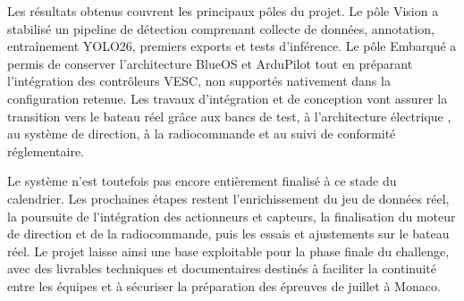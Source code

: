 \documentclass[11pt,letterpaper]{article}
\begin{document}
Les résultats obtenus couvrent les principaux pôles du projet. 
Le pôle Vision a stabilisé un pipeline de détection comprenant collecte de 
données, annotation, entraînement YOLO26, premiers exports et tests d'inférence. 
Le pôle Embarqué a permis de conserver l'architecture BlueOS et ArduPilot tout en 
préparant l'intégration des contrôleurs VESC, non supportés nativement dans la 
configuration retenue. Les travaux d'intégration et de conception vont assurer la 
transition vers le bateau réel grâce aux bancs de test, à l'architecture électrique
, au système de direction, à la radiocommande et au suivi de conformité 
réglementaire.

Le système n'est toutefois pas encore entièrement finalisé à ce stade du calendrier. Les prochaines étapes restent l'enrichissement du jeu de données réel, la poursuite de l'intégration des actionneurs et capteurs, la finalisation du moteur de direction et de la radiocommande, puis les essais et ajustements sur le bateau réel. Le projet laisse ainsi une base exploitable pour la phase finale du challenge, avec des livrables techniques et documentaires destinés à faciliter la continuité entre les équipes et à sécuriser la préparation des épreuves de juillet à Monaco.
\end{document}
